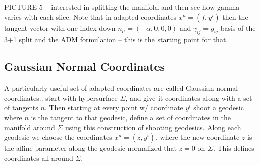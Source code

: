 \documentclass[10pt]{article}
\begin{document}
	
	PICTURE 5 -- interested in splitting the manifold and then see how gamma varies with each slice. Note that in adapted coordinates $x^\mu = (f, y^i)$ then the tangent vector with one index down $n_\mu = (-\alpha, 0 ,0,0)$ and $\gamma_{ij} = g_{ij}$ basis of the 3+1 split and the ADM formulation -- this is the starting point for that. 
	
	\subsection{Gaussian Normal Coordinates}
	A particularly useful set of adapted coordinates are called Gaussian normal coordinates.. start with hypersurface $\Sigma$,  and give it coordinates along with a set of tangents $n$. Then starting at every point w/ coordinate $y^i$ shoot a geodesic where $n$ is the tangent to that geodesic, define a set of coordinates in the manifold around $\Sigma$ using this construction of shooting geodesics. Along each geodesic we choose the coordinates $x^\mu = (z,y^i)$, where the new coordinate $z$ is the affine parameter along the geodesic normalized that $z=0$ on $\Sigma$. This defines coordinates all around $\Sigma$. 
\end{document}
